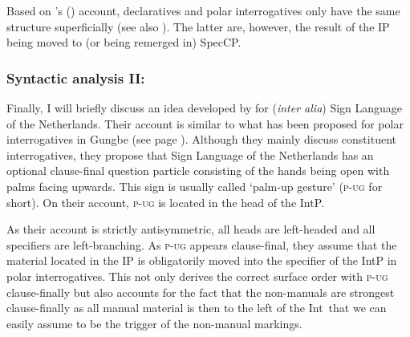 \begin{exe}
\ex\label{ex:petroniolillomartinleftwardababa} 
\end{exe}

\noindent Based on \citeauthor{sarac2006interrogative}'s (\citeyear{sarac2006interrogative}) account, declaratives and polar interrogatives only have the same structure superficially (see also \citealt{sarac2007cross}). The latter are, however, the result of the IP being moved to (or being remerged in) SpecCP.

\subsubsection{Syntactic analysis II: \citet{aboh2010sa}}
Finally, I will briefly discuss an idea developed by \citet{aboh2010sa} for (\textit{inter alia}) Sign Language of the Netherlands. Their account is similar to what has been proposed for polar interrogatives in Gungbe (see page \pageref{ex:gungbepolarinterrogativetree}). Although they mainly discuss constituent interrogatives, they propose that Sign Language of the Netherlands has an optional clause-final question particle consisting of the hands being open with palms facing upwards. This sign is usually called `palm-up gesture' (\textsc{p-ug} for short). On their account, \textsc{p-ug} is located in the head of the IntP. 

As their account is strictly antisymmetric, all heads are left-headed and all specifiers are left-branching. As \textsc{p-ug} appears clause-final, they assume that the material located in the IP is obligatorily moved into the specifier of the IntP in polar interrogatives. This not only derives the correct surface order with \textsc{p-ug} clause-finally but also accounts for the fact that the non-manuals are strongest clause-finally as all manual material is then to the left of the Int\textdegree\ that we can easily assume to be the trigger of the non-manual markings.

